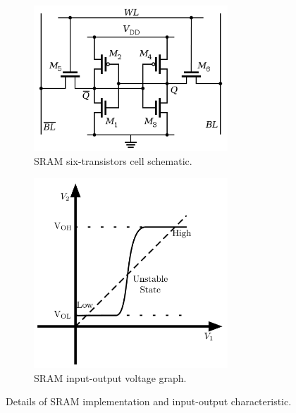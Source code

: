\documentclass[../tesi.tex]{subfiles}
\begin{document}
\begin{figure}
	\centering
	\begin{subfigure}[t]{.5\textwidth}
		\centering
		\includegraphics[width=0.8\textwidth]{images/sramcell.png}
		\caption{SRAM six-transistors cell schematic.}
		\label{fig:sramcell}
	\end{subfigure}%
	\begin{subfigure}[t]{.5\textwidth}
		\centering
		\includegraphics[width=0.8\textwidth]{images/sram_cell_graph.pdf}
		\caption{SRAM input-output voltage graph.}
		\label{fig:sram-graph}
	\end{subfigure}
	\caption{Details of SRAM implementation and input-output characteristic.}
	\label{fig:sram}
\end{figure}
\end{document}
